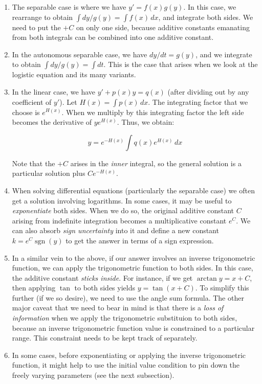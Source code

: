 \documentclass{amsart}
\begin{document}
\begin{enumerate}

\item The separable case is where we have $y' = f(x)g(y)$. In this
  case, we rearrange to obtain $\int dy/g(y) = \int f(x) \, dx$, and
  integrate both sides. We need to put the $+C$ on only one side,
  because additive constants emanating from both integrals can be
  combined into one additive constant.
\item In the autonomous separable case, we have $dy/dt = g(y)$, and we
  integrate to obtain $\int dy/g(y) = \int dt$. This is the case that
  arises when we look at the logistic equation and its many variants.
\item In the linear case, we have $y' + p(x)y = q(x)$ (after dividing
  out by any coefficient of $y'$). Let $H(x) = \int p(x) \, dx$. The
  integrating factor that we choose is $e^{H(x)}$. When we multiply by
  this integrating factor the left side becomes the derivative of
  $ye^{H(x)}$. Thus, we obtain:

  $$y = e^{-H(x)} \int q(x)e^{H(x)} \, dx$$

  Note that the $+C$ arises in the {\em inner} integral, so the
  general solution is a particular solution plus $Ce^{-H(x)}$.
\item When solving differential equations (particularly the separable
  case) we often get a solution involving logarithms. In some cases,
  it may be useful to {\em exponentiate} both sides. When we do so,
  the original additive constant $C$ arising from indefinite
  integration becomes a multiplicative constant $e^C$. We can also
  absorb {\em sign uncertainty} into it and define a new constant $k =
  e^C\operatorname{sgn}(y)$ to get the answer in terms of a sign
  expression.
\item In a similar vein to the above, if our answer involves an
  inverse trigonometric function, we can apply the trigonometric
  function to both sides. In this case, the additive constant {\em
  sticks inside}. For instance, if we get $\arctan y = x + C$, then
  applying $\tan$ to both sides yields $y = \tan(x + C)$. To simplify
  this further (if we so desire), we need to use the angle sum
  formula. The other major caveat that we need to bear in mind is that
  there is a {\em loss of information} when we apply the trigonometric
  substituion to both sides, because an inverse trigonometric function
  value is constrained to a particular range. This constraint needs to
  be kept track of separately.
\item In some cases, before exponentiating or applying the inverse
  trigonometric function, it might help to use the initial value
  condition to pin down the freely varying parameters (see the next
  subsection).
\end{enumerate}
\end{document}
